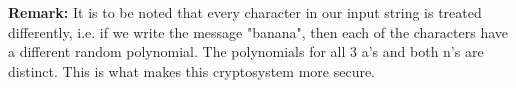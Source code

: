 \documentclass[a4paper,12pt]{article}
\begin{document}
\begin{flushleft}
\textbf{Remark:} It is to be noted that every character in our input string is treated differently, i.e. if we write the message "banana", then each of the characters have a different random polynomial. The polynomials for all 3 a's and both n's are distinct. This is what makes this cryptosystem more secure.
\end{flushleft}

%
%
%
\end{document}
